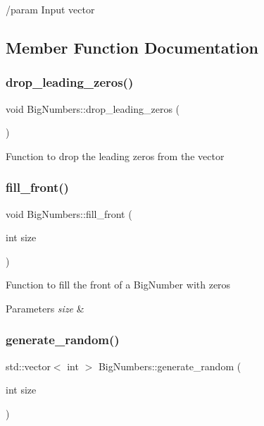 /param Input vector 

\subsection{Member Function Documentation}
\mbox{\label{classBigNumbers_ac335a2d818b21193d9dc6616d12cd87d}} 
\subsubsection{\texorpdfstring{drop\+\_\+leading\+\_\+zeros()}{drop\_leading\_zeros()}}
{\footnotesize\ttfamily void Big\+Numbers\+::drop\+\_\+leading\+\_\+zeros (\begin{DoxyParamCaption}{ }\end{DoxyParamCaption})}

Function to drop the leading zeros from the vector \mbox{\label{classBigNumbers_a01e273aec9f5996878710e9bf1ba4273}} 
\subsubsection{\texorpdfstring{fill\+\_\+front()}{fill\_front()}}
{\footnotesize\ttfamily void Big\+Numbers\+::fill\+\_\+front (\begin{DoxyParamCaption}\item[{int}]{size }\end{DoxyParamCaption})}

Function to fill the front of a Big\+Number with zeros 
\begin{DoxyParams}{Parameters}
{\em size} & \\
\hline
\end{DoxyParams}
\mbox{\label{classBigNumbers_a98c90a5e552783479d6b42a7a55e3f84}} 
\subsubsection{\texorpdfstring{generate\+\_\+random()}{generate\_random()}}
{\footnotesize\ttfamily std\+::vector$<$ int $>$ Big\+Numbers\+::generate\+\_\+random (\begin{DoxyParamCaption}\item[{int}]{size }\end{DoxyParamCaption})}

